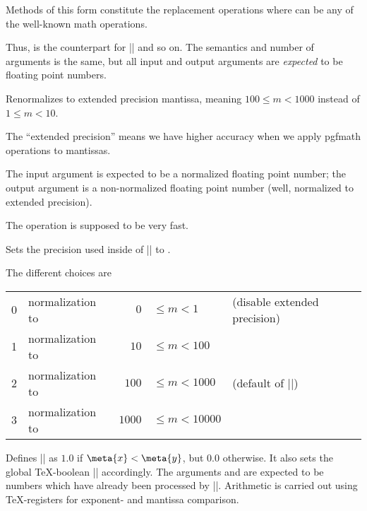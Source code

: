 \begin{command}{\pgfmathfloat{}}
  Methods of this form constitute the replacement operations where
   can be any of the well-known math operations. 

  Thus, \declareandlabel{\pgfmathfloatadd} is the counterpart
  for |\pgfmathadd| and so on. The semantics and number of
  arguments is the same, but all input and output arguments are
  \emph{expected} to be floating point numbers. 
\end{command}

\begin{command}{}
  Renormalizes  to extended precision mantissa, meaning
  $100 \le m < 1000$ instead of $1 \le m < 10$.
  
  The ``extended precision'' means we have higher accuracy when we apply
  pgfmath operations to mantissas. 
  
  The input argument is expected to be a normalized floating point
  number; the output argument is a non-normalized floating point number
  (well, normalized to extended precision). 
  
  The operation is supposed to be very fast.
\end{command}

\begin{command}{\pgfmathfloatsetextprecision{}}
  Sets the precision used inside of |\pgfmathfloattoextentedprecision| to .
  
  The different choices are
  
  \begin{tabular}{llrll}
    0 & normalization to &    $0$ & $\le m < 1$ 	& (disable extended precision)\\
    1 & normalization to &   $10$ & $\le m < 100$	\\
    2 & normalization to & 	$100$ & $\le m < 1000$	& (default of |\pgfmathfloattoextentedprecision|)\\
    3 & normalization to & $1000$ & $\le m < 10000$	\\
  \end{tabular}
\end{command}

\begin{command}{}
  Defines |\pgfmathresult| as $1.0$ if $\meta{x} < \meta{y}$, but
  $0.0$ otherwise. It also sets the global \TeX-boolean
  |\pgfmathfloatcomparison| accordingly. The arguments  and
   are expected to be numbers which have already been
  processed by |\pgfmathfloatparsenumber|. Arithmetic is carried out
  using \TeX-registers for exponent- and mantissa comparison. 
\end{command}

